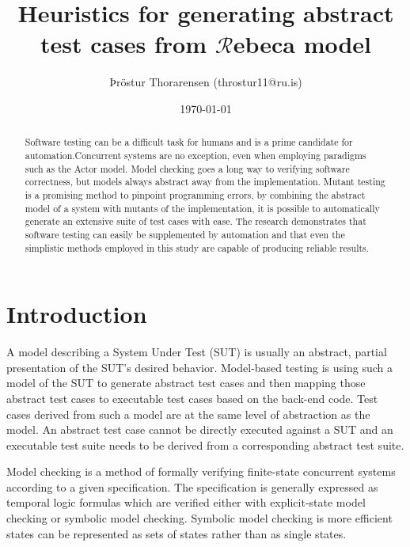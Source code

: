 \documentclass{article}
\begin{document}
\newcommand{\Rebeca}{$\mathcal{R}$ebeca\xspace}


\title{Heuristics for generating abstract test cases from \Rebeca model}
\author{Þröstur Thorarensen (throstur11@ru.is)}
\date{\today}
\maketitle

\begin{abstract}
	Software testing can be a difficult task for humans and is a prime candidate for automation.Concurrent systems are no exception, even when employing paradigms such as the Actor model. Model checking goes a long way to verifying software correctness, but models always abstract away from the implementation. Mutant testing is a promising method to pinpoint programming errors, by combining the abstract model of a system with mutants of the implementation, it is possible to automatically generate an extensive suite of test cases with ease. The research demonstrates that software testing can easily be supplemented by automation and that even the simplistic methods employed in this study are capable of producing reliable results.
\end{abstract}

\newpage
\tableofcontents
\newpage

	\section{Introduction}
		A model describing a System Under Test (SUT) is usually an abstract, partial presentation of the SUT's desired behavior. Model-based testing is using such a model of the SUT to generate abstract test cases and then mapping those abstract test cases to executable test cases based on the back-end code. Test cases derived from such a model are at the same level of abstraction as the model. An abstract test case cannot be directly executed against a SUT and an executable test suite needs to be derived from a corresponding abstract test suite.

		Model checking is a method of formally verifying finite-state concurrent systems according to a given specification. The specification is generally expressed as temporal logic formulas which are verified either with explicit-state model checking or symbolic model checking. Symbolic model checking is more efficient states can be represented as sets of states rather than as single states.
\end{document}
